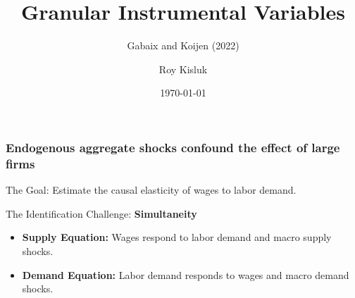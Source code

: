 \documentclass[aspectratio=169,11pt]{beamer}
\begin{document}
\begin{frame}
    \title{Granular Instrumental Variables}
    \subtitle{Gabaix and Koijen (2022)}
    \author{Roy Kisluk}
    \date{\today}
    \titlepage
\end{frame}



\begin{frame}
    \frametitle{Endogenous aggregate shocks confound the effect of large firms}

    \vspace{0.5cm}
    {\Large
        The Goal: Estimate the causal elasticity of wages to labor demand.
    }

    \vspace{0.8cm}
    {\Large
        The Identification Challenge: \textbf{Simultaneity}
    }

    \vspace{0.4cm}
    \begin{itemize}
        \item \textbf{Supply Equation:} Wages respond to labor demand and macro supply shocks.
        \item \textbf{Demand Equation:} Labor demand responds to wages and macro demand shocks.
    \end{itemize}


\end{frame}
\end{document}
